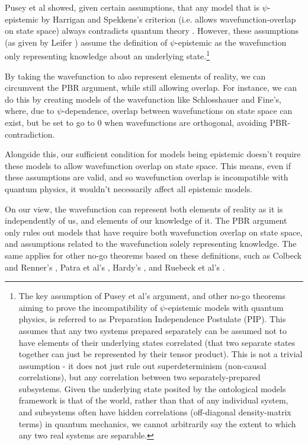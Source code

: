 \documentclass[superscriptaddress,reprint, floatfix, prl,nofootinbib]{revtex4-2}
\begin{document}
Pusey et al showed, given certain assumptions, that any model that is $\psi$-epistemic by Harrigan and Spekkens's criterion (i.e. allows wavefunction-overlap on state space) always contradicts quantum theory \cite{Pusey2012OnTheReality}. However, these assumptions (as given by Leifer \cite{Leifer2014Review}) assume the definition of $\psi$-epistemic as the wavefunction only representing knowledge about an underlying state.\footnote{The key assumption of Pusey et al's argument, and other no-go theorems aiming to prove the incompatibility of $\psi$-epistemic models with quantum physics, is referred to as Preparation Independence Postulate (PIP). This assumes that any two systems prepared separately can be assumed not to have elements of their underlying states correlated (that two separate states together can just be represented by their tensor product). This is not a trivial assumption \cite{Lewis2012Compatible} - it does not just rule out superdeterminism (non-causal correlations), but any correlation between two separately-prepared subsystems. Given the underlying state posited by the ontological models framework is that of the world, rather than that of any individual system, and subsystems often have hidden correlations (off-diagonal density-matrix terms) in quantum mechanics, we cannot arbitrarily say the extent to which any two real systems are separable.}

By taking the wavefunction to also represent elements of reality, we can circumvent the PBR argument, while still allowing overlap. For instance, we can do this by creating models of the wavefunction like Schlosshauer and Fine's, where, due to $\psi$-dependence, overlap between wavefunctions on state space can exist, but be set to go to 0 when wavefunctions are orthogonal, avoiding PBR-contradiction.

Alongside this, our sufficient condition for models being epistemic doesn't require these models to allow wavefunction overlap on state space. This means, even if these assumptions are valid, and so wavefunction overlap is incompatible with quantum physics, it wouldn't necessarily affect all epistemic models.

On our view, the wavefunction can represent both elements of reality as it is independently of us, and elements of our knowledge of it. The PBR argument only rules out models that have require both wavefunction overlap on state space, and assumptions related to the wavefunction solely representing knowledge. The same applies for other no-go theorems based on these definitions, such as Colbeck and Renner's \cite{Colbeck2012Correspondence}, Patra et al's \cite{Patra2013NoGo}, Hardy's \cite{Hardy2013QStatesReal}, and Ruebeck et al's \cite{Ruebeck2020Epistemic}.
\end{document}
